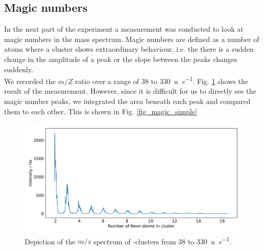 \documentclass[a4paper,10pt]{article}
\begin{document}
\subsection{Magic numbers}
In the next part of the experiment a measurement was conducted to look at magic numbers in the mass spectrum. Magic numbers are defined as a number of atoms where a cluster shows extraordinary behaviour, i.e. the there is a sudden change in the amplitude of a peak or the slope between the peaks changes suddenly. \\
We recorded the $m/Z$ ratio over a range of \SI{38}{} to \SI{330}{\atomicmassunit \per \elementarycharge}. Fig. \ref{fig_magic_peak} shows the result of the measurement. However, since it is difficult for us to directly see the magic number peaks, we integrated the area beneath each peak and compared them to each other. This is shown in Fig. \ref{fig_magic_simple}

\begin{figure}[H]
	\centering
	\includegraphics[width = 0.8 \textwidth]{magic_peaks.pdf}
	\caption{Depiction of the $m/z$ spectrum of -clusters from \SI{38}{} to \SI{330}{\atomicmassunit \per \elementarycharge}.}
	\label{fig_magic_peak}
\end{figure}
\end{document}
